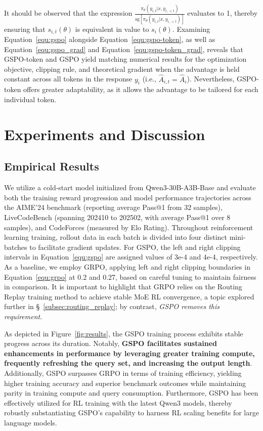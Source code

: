 It should be observed that the expression $\frac{ \pi_{\theta} (y_{i,t} | x, y_{i,<t}) }{ \mathrm{sg} \left[ \pi_{\theta} (y_{i,t} | x, y_{i,<t}) \right] }$ evaluates to 1, thereby ensuring that $s_{i,t}(\theta)$ is equivalent in value to $s_{i}(\theta)$. Examining Equation~\eqref{equ:gspo} alongside Equation~\eqref{equ:gspo-token}, as well as Equation~\eqref{equ:gspo_grad} and Equation~\eqref{equ:gspo-token_grad}, reveals that GSPO-token and GSPO yield matching numerical results for the optimization objective, clipping rule, and theoretical gradient when the advantage is held constant across all tokens in the response $y_i$ (i.e., $\widehat{A}_{i,t} = \widehat{A}_{i}$). Nevertheless, GSPO-token offers greater adaptability, as it allows the advantage to be tailored for each individual token.

\section{Experiments and Discussion}

\subsection{Empirical Results}

We utilize a cold-start model initialized from Qwen3-30B-A3B-Base and evaluate both the training reward progression and model performance trajectories across the AIME'24 benchmark (reporting average Pass@1 from 32 samples), LiveCodeBench (spanning 202410 to 202502, with average Pass@1 over 8 samples), and CodeForces (measured by Elo Rating). Throughout reinforcement learning training, rollout data in each batch is divided into four distinct mini-batches to facilitate gradient updates. For GSPO, the left and right clipping intervals in Equation~\eqref{equ:gspo} are assigned values of 3e-4 and 4e-4, respectively. As a baseline, we employ GRPO, applying left and right clipping boundaries in Equation~\eqref{equ:grpo} at 0.2 and 0.27, based on careful tuning to maintain fairness in comparison. It is important to highlight that GRPO relies on the Routing Replay training method to achieve stable MoE RL convergence, a topic explored further in \S~\ref{subsec:routing_replay}; by contrast, \textit{GSPO removes this requirement}.

As depicted in Figure~\ref{fig:results}, the GSPO training process exhibits stable progress across its duration. Notably, \textbf{GSPO facilitates sustained enhancements in performance by leveraging greater training compute, frequently refreshing the query set, and increasing the output length}. Additionally, GSPO surpasses GRPO in terms of training efficiency, yielding higher training accuracy and superior benchmark outcomes while maintaining parity in training compute and query consumption. Furthermore, GSPO has been effectively utilized for RL training with the latest Qwen3 models, thereby robustly substantiating GSPO's capability to harness RL scaling benefits for large language models.

